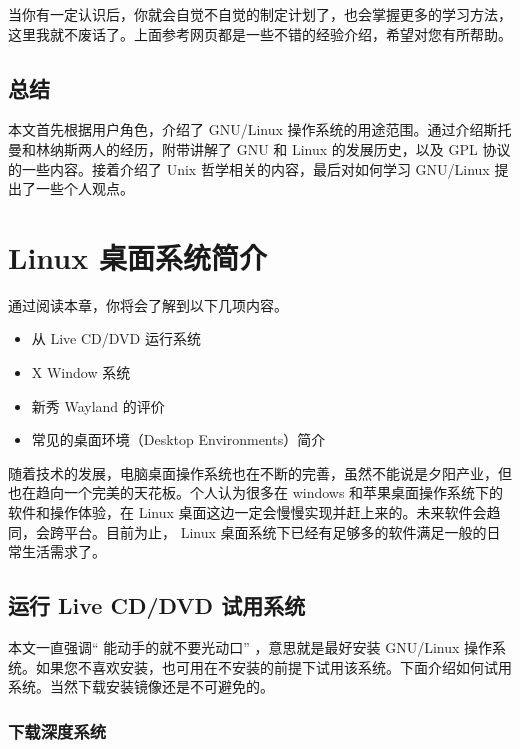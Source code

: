 \documentclass[doctor,openright,twoside]{sjtuthesis}
\providecommand{\tightlist}{%
    \setlength{\itemsep}{0pt}\setlength{\parskip}{0pt}}
\theoremstyle{plain}
\theoremstyle{definition}
\theoremstyle{remark}
\theoremstyle{ocrenumbox}
\theoremstyle{plain}
\begin{document}
当你有一定认识后，你就会自觉不自觉的制定计划了，也会掌握更多的学习方法，这里我就不废话了。上面参考网页都是一些不错的经验介绍，希望对您有所帮助。

\hypertarget{section-5}{%
\section{总结}\label{section-5}}

本文首先根据用户角色，介绍了 GNU/Linux 操作系统的用途范围。通过介绍斯托曼和林纳斯两人的经历，附带讲解了 GNU 和 Linux 的发展历史，以及 GPL 协议的一些内容。接着介绍了 Unix 哲学相关的内容，最后对如何学习 GNU/Linux 提出了一些个人观点。

\hypertarget{chap:linux-desktop-intro}{%
\chapter{Linux 桌面系统简介}\label{chap:linux-desktop-intro}}

通过阅读本章，你将会了解到以下几项内容。

\begin{itemize}
\tightlist
\item
  从 Live CD/DVD 运行系统
\item
  X Window 系统
\item
  新秀 Wayland 的评价
\item
  常见的桌面环境（Desktop Environments）简介
\end{itemize}

随着技术的发展，电脑桌面操作系统也在不断的完善，虽然不能说是夕阳产业，但也在趋向一个完美的天花板。个人认为很多在 windows 和苹果桌面操作系统下的软件和操作体验，在 Linux 桌面这边一定会慢慢实现并赶上来的。未来软件会趋同，会跨平台。目前为止， Linux 桌面系统下已经有足够多的软件满足一般的日常生活需求了。

\hypertarget{live-cddvd-}{%
\section{运行 Live CD/DVD 试用系统}\label{live-cddvd-}}

本文一直强调`` 能动手的就不要光动口'' ，意思就是最好安装 GNU/Linux 操作系统。如果您不喜欢安装，也可用在不安装的前提下试用该系统。下面介绍如何试用系统。当然下载安装镜像还是不可避免的。

\hypertarget{section-6}{%
\subsection{下载深度系统}\label{section-6}}
\end{document}
